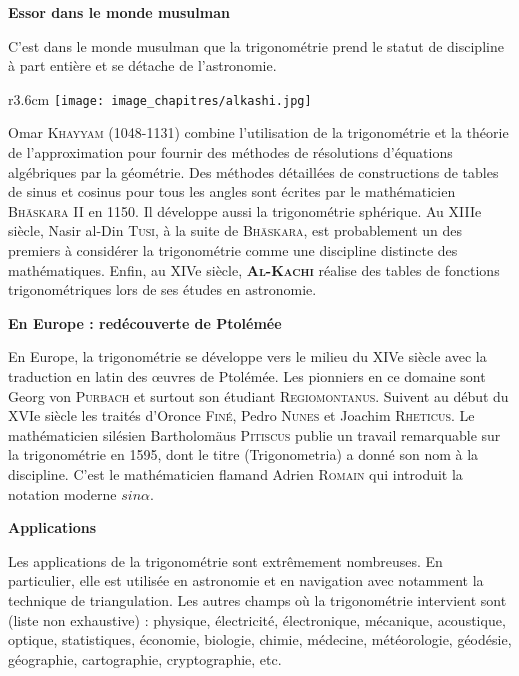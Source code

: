 \begin{His}
\vspace{0.4cm}

\textbf{Essor dans le monde musulman}

C'est dans le monde musulman que la trigonométrie prend le statut de discipline à part entière et se détache de l'astronomie.
\vspace{0.2cm}
\begin{wrapfigure}[12]{r}{3.6cm}
\vspace{-7mm}
\texttt{[image: image\_chapitres/alkashi.jpg]} 
\end{wrapfigure}
Omar \textsc{Khayyam} (1048-1131) combine l'utilisation de la trigonométrie et la théorie de l'approximation pour fournir des méthodes de résolutions d'équations algébriques par la géométrie. Des méthodes détaillées de constructions de tables de sinus et cosinus pour tous les angles sont écrites par le mathématicien \textsc{Bhāskara II} en 1150. Il développe aussi la trigonométrie sphérique. Au XIIIe siècle, Nasir al-Din \textsc{Tusi}, à la suite de \textsc{Bhāskara}, est probablement un des premiers à considérer la trigonométrie comme une discipline distincte des mathématiques. Enfin, au XIVe siècle, \textsc{\textbf{Al-Kachi}} réalise des tables de fonctions trigonométriques lors de ses études en astronomie.

\vspace{0.4cm}

\textbf{En Europe : redécouverte de Ptolémée}

En Europe, la trigonométrie se développe vers le milieu du XIVe siècle avec la traduction en latin des œuvres de Ptolémée. Les pionniers en ce domaine sont Georg von \textsc{Purbach} et surtout son étudiant \textsc{Regiomontanus}. Suivent au début du XVIe siècle les traités d'Oronce \textsc{Finé}, Pedro \textsc{Nunes} et Joachim \textsc{Rheticus}. Le mathématicien silésien Bartholomäus \textsc{Pitiscus} publie un travail remarquable sur la trigonométrie en 1595, dont le titre (Trigonometria) a donné son nom à la discipline. C'est le mathématicien flamand Adrien \textsc{Romain} qui introduit la notation moderne $sin \alpha$.

\vspace{0.4cm}
\textbf{Applications}

Les applications de la trigonométrie sont extrêmement nombreuses. En particulier, elle est utilisée en astronomie et en navigation avec notamment la technique de triangulation. Les autres champs où la trigonométrie intervient sont (liste non exhaustive) : physique, électricité, électronique, mécanique, acoustique, optique, statistiques, économie, biologie, chimie, médecine, météorologie, géodésie, géographie, cartographie, cryptographie, etc.



\end{His}
